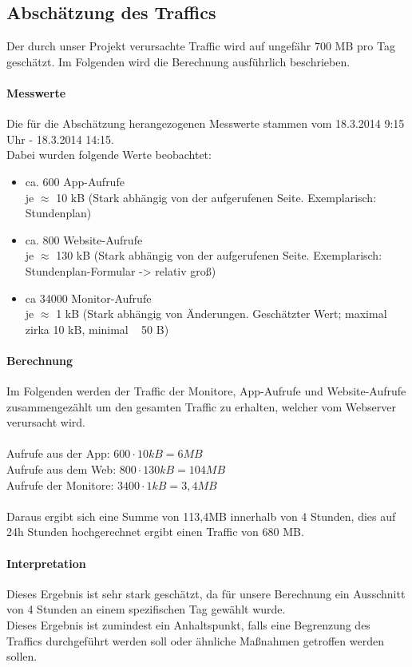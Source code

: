 \subsection{Abschätzung des Traffics}
Der durch unser Projekt verursachte Traffic wird auf ungefähr 700 MB pro Tag geschätzt. Im Folgenden wird die Berechnung ausführlich beschrieben.\\

\paragraph{Messwerte\\}
Die für die Abschätzung herangezogenen Messwerte stammen vom 18.3.2014 9:15 Uhr - 18.3.2014 14:15.\\
Dabei wurden folgende Werte beobachtet:

\begin{itemize}
	\item ca. 600 App-Aufrufe\\
	je $ \approx  $ 10 kB (Stark abhängig von der aufgerufenen Seite. Exemplarisch: Stundenplan)
	\item ca.  800 Website-Aufrufe\\
	je $ \approx  $ 130 kB (Stark abhängig von der aufgerufenen Seite. Exemplarisch: Stundenplan-Formular -> relativ groß)
	\item ca 34000 Monitor-Aufrufe\\
	je $ \approx  $   1 kB (Stark abhängig von Änderungen. Geschätzter Wert; maximal zirka 10 kB, minimal ~ 50 B)
\end{itemize}

\paragraph{Berechnung\\}

Im Folgenden werden der Traffic der Monitore, App-Aufrufe und Website-Aufrufe zusammengezählt um den gesamten Traffic zu erhalten, welcher vom Webserver verursacht wird.\\
\\
Aufrufe aus der App: $ 600 \cdot 10 kB = 6MB $\\
Aufrufe aus dem Web: $ 800 \cdot 130 kB = 104 MB $\\
Aufrufe der Monitore: $ 3400 \cdot 1kB = 3,4MB $\\
\\
Daraus ergibt sich eine Summe von 113,4MB innerhalb von 4 Stunden, dies auf 24h Stunden hochgerechnet ergibt einen Traffic von 680 MB.\\

\paragraph{Interpretation\\}
Dieses Ergebnis ist sehr stark geschätzt, da für unsere Berechnung ein Ausschnitt von 4 Stunden an einem spezifischen Tag gewählt wurde.\\
Dieses Ergebnis ist zumindest ein Anhaltspunkt, falls eine Begrenzung des Traffics durchgeführt werden soll oder ähnliche Maßnahmen getroffen werden sollen.